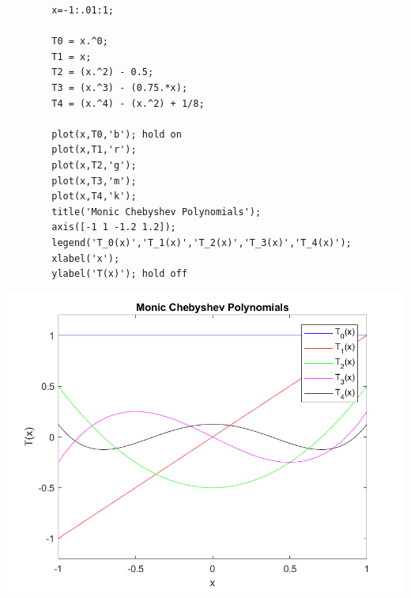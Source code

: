 \documentclass{article}
\begin{document}
\begin{enumerate}
\begin{lstlisting}
        x=-1:.01:1;

        T0 = x.^0;
        T1 = x;
        T2 = (x.^2) - 0.5;
        T3 = (x.^3) - (0.75.*x);
        T4 = (x.^4) - (x.^2) + 1/8;

        plot(x,T0,'b'); hold on
        plot(x,T1,'r');
        plot(x,T2,'g');
        plot(x,T3,'m');
        plot(x,T4,'k');
        title('Monic Chebyshev Polynomials');
        axis([-1 1 -1.2 1.2]);
        legend('T_0(x)','T_1(x)','T_2(x)','T_3(x)','T_4(x)');
        xlabel('x');
        ylabel('T(x)'); hold off

        \end{lstlisting}
        \begin{center}
            \includegraphics[scale=0.7]{monic.png}
        \end{center}
        

\end{enumerate}
\end{document}
